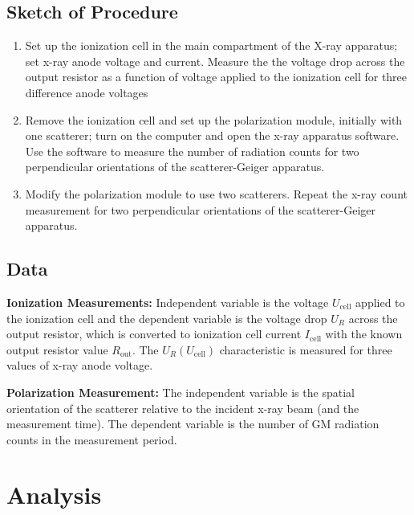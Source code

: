 \documentclass[11pt, a4paper]{article}
\begin{document}
\subsection{Sketch of Procedure}
\begin{enumerate}
	
	\item Set up the ionization cell in the main compartment of the X-ray apparatus; set x-ray anode voltage and current. Measure the the voltage drop across the output resistor as a function of voltage applied to the ionization cell for three difference anode voltages
	
	\item Remove the ionization cell and set up the polarization module, initially with one scatterer; turn on the computer and open the x-ray apparatus software. Use the software to measure the number of radiation counts for two perpendicular orientations of the scatterer-Geiger apparatus.
	
	\item Modify the polarization module to use two scatterers. Repeat the x-ray count measurement for two perpendicular orientations of the scatterer-Geiger apparatus.
	
\end{enumerate}

\subsection{Data}
\textbf{Ionization Measurements:} Independent variable is the voltage $ U_{\text{cell}} $ applied to the ionization cell and the dependent variable is the voltage drop $ U_{R} $ across the output resistor, which is converted to ionization cell current $ I_{\text{cell}} $ with the known output resistor value $ R_{\text{out}} $. The $ U_{R}(U_{\text{cell}}) $ characteristic is measured for three values of x-ray anode voltage.

\vspace{2mm}
\textbf{Polarization Measurement:} The independent variable is the spatial orientation of the scatterer relative to the incident x-ray beam (and the measurement time). The dependent variable is the number of GM radiation counts in the measurement period. 


\section{Analysis}
\end{document}
